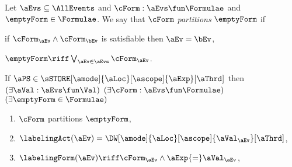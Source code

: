 \begin{scope}
  \label{def:semca}
  \label{def:partition}
  Let $\aEvs\subseteq\AllEvents$ and $\cForm:\aEvs\fun\Formulae$ and
  $\emptyForm\in\Formulae$.  We say that $\cForm$ \emph{partitions}
  $\emptyForm$ if
    \begin{enumerate*}
    \item if $\cForm_\aEv\land\cForm_\bEv$ is satisfiable then $\aEv=\bEv$,
    \item $\emptyForm\riff\bigvee_{\aEv\in\aEvs}\cForm_\aEv$.
    \end{enumerate*}
    \smallskip

  
  \noindent
  If $\aPS \in \sSTORE[\amode]{\aLoc}[\ascope]{\aExp}[\aThrd]$ then
  $(\exists\aVal:\aEvs\fun\Val)$
  $(\exists\cForm:\aEvs\fun\Formulae)$
  $(\exists\emptyForm\in\Formulae)$
  \begin{multicols}{2}
  \begin{enumerate}[topsep=0pt,label=(\textsc{w}\arabic*),ref=\textsc{w}\arabic*]
  \item \label{write-E-ca}
    $\cForm$ partitions $\emptyForm$,
  \item \label{write-lambda-ca}
    $\labelingAct(\aEv) = \DW[\amode]{\aLoc}[\ascope]{\aVal_\aEv}[\aThrd]$,
  \item \label{write-kappa-ca}
    \begin{math}
      \labelingForm(\aEv) \riff
      \cForm_\aEv
      \land \aExp{=}\aVal_\aEv
    \end{math},
    

\end{enumerate}
\end{multicols}
\end{scope}

